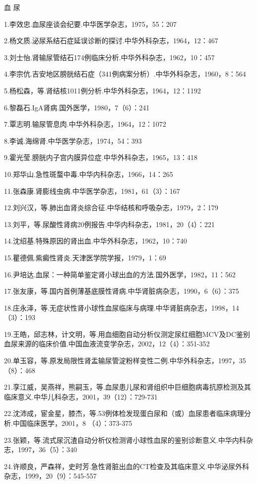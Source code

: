 血 尿

1.李效忠.血尿座谈会纪要.中华医学杂志，1975，55：207

2.杨文质.泌尿系结石症延误诊断的探讨.中华外科杂志，1964，12：467

3.刘士怡.肾输尿管结石174例临床分析.中华外科杂志，1962，10：457

4.李宗伉.吉安地区膀胱结石症（341例病案分析）.中华外科杂志，1960，8：564

5.杨松森，等.肾结核1011例分析.中华外科杂志，1964，12：1192

6.黎磊石.IgA肾病.国外医学，1980，7（6）：241

7.覃志明.输尿管息肉.中华外科杂志，1964，12：1072

8.李诚.海绵肾.中华医学杂志，1974，54：393

9.霍光莹.膀胱内子宫内膜异位症.中华外科杂志，1965，13：418

10.郑华山.急性斑蝥中毒.中华内科杂志，1966，14：265

11.张森康.肾膨线虫病.中华医学杂志，1981，61（3）：167

12.刘兴汉，等.肺出血肾炎综合征.中华结核和呼吸杂志，1979，2：179

13.刘平，等.尿酸性肾病20例报告.中华内科杂志，1981，20（4）：221

14.沈绍基.特殊原因的肾出血.中华外科杂志，1962，10：740

15.瞿德佩.紫癜性肾炎.天津医学院学报，1979，1：69

16.尹培达.血尿：一种简单鉴定肾小球出血的方法.国外医学，1982，11：562

17.张友康，等.国内首例薄基底膜性肾病.中华肾脏病杂志，1990，6（6）：375

18.庄永泽，等.无症状性肾小球性血尿临床与病理.中华肾脏病杂志，1998，14（3）：193

19.王皓，邱志林，计文明，等.用血细胞自动分析仪测定尿红细胞MCV及DC鉴别血尿来源的临床价值.中国血液流变学杂志，2002，12（4）：351-352

20.单玉容，等.原发局限性肾盂输尿管淀粉样变性二例.中华外科杂志，1997，35（8）：468

21.孪江威，吴燕祥，熊嗣玉，等.血尿患儿尿和肾组织中巨细胞病毒抗原检测及其临床意义.中华儿科杂志，2001，39（12）：729-731

22.沈沛成，宦金星，膝杰，等.53例体检发现蛋白尿和（或）血尿患者临床病理分析.中国临床医学，2001，8
（4）：373-375

23.张颖，等.流式尿沉渣自动分析仪检测肾小球性血尿的鉴别诊断意义.中华内科杂志，1997，36（5）：340

24.许顺良，严森祥，史时芳.急性肾脏出血的CT检查及其临床意义.中华泌尿外科杂志，1999，20（9）：545-557

